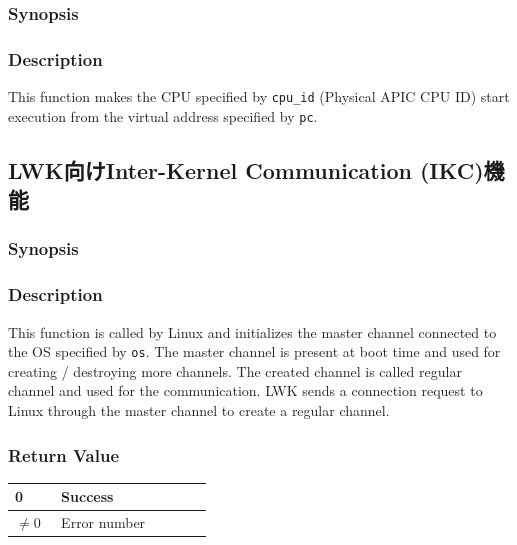 \documentclass[twoside,11pt,fleqn]{book}
\begin{document}
\subsubsection{}
\subsubsection*{Synopsis}{\quad}
\subsubsection*{Description}{\quad}
This function makes the CPU specified by \texttt{cpu\_id} (Physical APIC CPU ID) start execution from the virtual address specified by \texttt{pc}.

\subsection{LWK向けInter-Kernel Communication (IKC)機能}\label{sec:ikc}

\subsubsection{}
\subsubsection*{Synopsis}{\quad}

\subsubsection*{Description}{\quad}
This function is called by Linux and initializes the master channel connected to the OS specified by \texttt{os}.
The master channel is present at boot time and used for creating / destroying more channels.
The created channel is called regular channel and used for the communication.
LWK sends a connection request to Linux through the master channel to create a regular channel.

\subsubsection*{Return Value}{\quad}
\begin{table}[!h]
\footnotesize
\begin{tabular}{|p{0.20\linewidth}|p{0.66\linewidth}|} \hline
0&Success\\ \hline
$\ne 0$&Error number\\ \hline
\end{tabular}
\vspace{-0em}
\end{table}
\FloatBarrier
\end{document}
